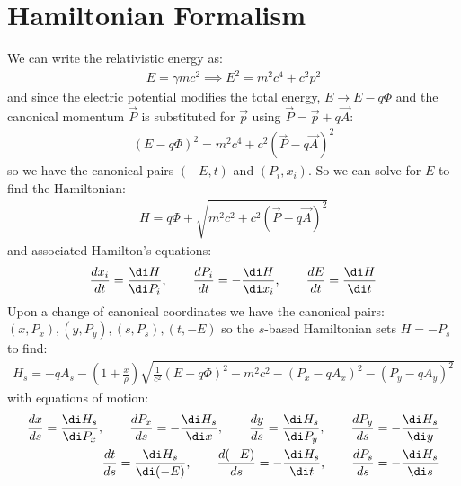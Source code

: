 \documentclass{article}
\numberwithin{equation}{section}
\begin{document}
\section{ Hamiltonian Formalism }
We can write the relativistic energy as:
\begin{align}
E = \gamma m c^2 \implies E^2 = m^2 c^4 + c^2 p^2
\end{align}
and since the electric potential modifies the total energy, $E \rightarrow E-q\Phi$ and the canonical momentum $\vec{P}$ is substituted for $\vec{p}$ using $\vec{P} = \vec{p} + q \vec{A}$:
\begin{align}
(E-q\Phi)^2 = m^2 c^4 + c^2 (\vec{P} - q \vec{A})^2
\end{align}
so we have the canonical pairs $(-E,t)$ and $(P_i, x_i)$. So we can solve for $E$ to find the Hamiltonian:
\begin{align}
H = q\Phi + \sqrt{ m^2 c^2 + c^2 (\vec{P}-q \vec{A})^2}
\end{align}
and associated Hamilton's equations:
\begin{align}
\frac{dx_i}{dt} = \frac{\di H}{\di P_i} ,\qquad 
\frac{d P_i}{dt} = -\frac{\di H}{\di x_i} , \qquad
\frac{d E}{dt} = \frac{\di H}{\di t}
\end{align}
Upon a change of canonical coordinates we have the canonical pairs: $(x,P_x), (y,P_y), (s,P_s), (t,-E)$ so the $s$-based Hamiltonian sets $H = -P_s$ to find:
\begin{align}
H_s = -q A_s - \left( 1 + \frac{x}{\rho}\right)\sqrt{ \frac{1}{c^2}(E-q\Phi)^2-m^2 c^2 - (P_x - qA_x)^2- (P_y - qA_y)^2}
\end{align}
with equations of motion:
\begin{align}
\frac{dx}{ds} = \frac{\di H_s}{\di P_x} ,\qquad 
\frac{d P_x}{ds} = - \frac{\di H_s}{\di x} , \qquad
\frac{dy}{ds} = \frac{\di H_s}{\di P_y} ,\qquad 
\frac{d P_y}{ds} = - \frac{\di H_s}{\di y} \\
\frac{dt}{ds} = \frac{\di H_s}{\di(-E)} , \qquad 
\frac{d(-E)}{ds} = - \frac{\di H_s}{\di t}, \qquad
\frac{d P_s}{ds} = - \frac{\di H_s}{\di s}
\end{align}
\end{document}
